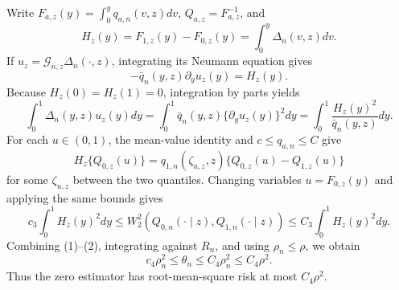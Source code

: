 Write \(F_{a,z}(y)=\int_0^yq_{a,n}(v,z)dv\), \(Q_{a,z}=F_{a,z}^{-1}\), and
\[
H_z(y)=F_{1,z}(y)-F_{0,z}(y)=\int_0^y\Delta_n(v,z)dv.
\]
If \(u_z=\mathcal G_{n,z}\Delta_n(\cdot,z)\), integrating its Neumann equation gives
\[
-\bar q_n(y,z)\partial_yu_z(y)=H_z(y).
\]
Because \(H_z(0)=H_z(1)=0\), integration by parts yields
\[
\int_0^1\Delta_n(y,z)u_z(y)dy
=\int_0^1\bar q_n(y,z)\{\partial_yu_z(y)\}^2dy
=\int_0^1\frac{H_z(y)^2}{\bar q_n(y,z)}dy.                                \tag{1}
\]
For each \(u\in(0,1)\), the mean-value identity and \(c\le q_{a,n}\le C\) give
\[
H_z\{Q_{0,z}(u)\}
=q_{1,n}(\zeta_{u,z},z)\{Q_{0,z}(u)-Q_{1,z}(u)\}
\]
for some \(\zeta_{u,z}\) between the two quantiles.  Changing variables \(u=F_{0,z}(y)\) and applying the same bounds gives
\[
c_3\int_0^1H_z(y)^2dy
\le W_2^2(Q_{0,n}(\cdot\mid z),Q_{1,n}(\cdot\mid z))
\le C_3\int_0^1H_z(y)^2dy.                                                \tag{2}
\]
Combining (1)--(2), integrating against \(R_n\), and using \(\rho_n\le\rho\), we obtain
\[
c_4\rho_n^2\le\theta_n\le C_4\rho_n^2\le C_4\rho^2.                    \tag{3}
\]
Thus the zero estimator has root-mean-square risk at most \(C_4\rho^2\).


